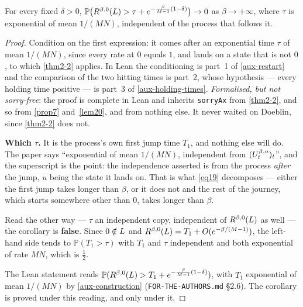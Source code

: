 \begin{corollary}
  \label{cor11}
  \leanok
  For every fixed $\delta > 0$,
  $\mathbb{P}\bigl(R^{\beta,0}(L) > \tau + e^{-\frac{\beta}{M-1}(1-\delta)}\bigr) \to 0$
  as $\beta \to +\infty$, where $\tau$ is exponential of mean $1/(MN)$,
  independent of the process that follows it.
\end{corollary}
\begin{proof}
  \leanok
  Condition on the first expression: it comes after an exponential time $\tau$
  of mean $1/(MN)$, since every rate at $0$ equals $1$, and lands on a state
  that is not $0$, to which \ref{thm2-2} applies.  In Lean the conditioning is
  part~1 of \ref{aux-restart} and the comparison of the two hitting times is
  part~2, whose hypothesis --- every holding time positive --- is part~3 of
  \ref{aux-holding-times}.  \emph{Formalised, but not sorry-free}: the proof is
  complete in Lean and inherits \texttt{sorryAx} from \ref{thm2-2}, and so from
  \ref{prop7} and~\ref{lem20}, and from nothing else.  It never
  waited on Doeblin, since \ref{thm2-2} does not.

  \textbf{Which $\tau$.}  It is the process's own first jump time $T_1$, and
  nothing else will do.  The paper says ``exponential of mean $1/(MN)$,
  independent from $(U^{\beta,u}_t)_t$'', and the superscript is the point: the
  independence asserted is from the process \emph{after} the jump, $u$ being
  the state it lands on.  That is what \ref{eq19} decomposes --- either the
  first jump takes longer than $\beta$, or it does not and the rest of the
  journey, which starts somewhere other than $0$, takes longer than $\beta$.

  Read the other way --- $\tau$ an independent copy, independent of
  $R^{\beta,0}(L)$ as well --- the corollary is \textbf{false}.  Since
  $0 \notin L$ and $R^{\beta,0}(L) = T_1 + O(e^{-\beta/(M-1)})$, the
  left-hand side tends to $\mathbb{P}(T_1 > \tau)$ with $T_1$ and $\tau$
  independent and both exponential of rate $MN$, which is $\tfrac12$.

  The Lean statement reads
  $\mathbb{P}(R^{\beta,0}(L) > T_1 + e^{-\frac{\beta}{M-1}(1-\delta)})$,
  with $T_1$ exponential of mean $1/(MN)$ by \ref{aux-construction}
  (\texttt{FOR-THE-AUTHORS.md} §2.6).  The corollary is proved under this
  reading, and only under it.
\end{proof}

